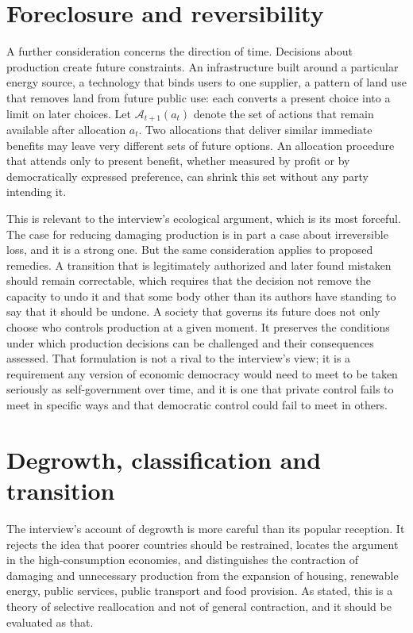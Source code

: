 \documentclass[12pt]{article}
\theoremstyle{definition}
\begin{document}
\section{Foreclosure and reversibility}\label{sec:foreclosure}

A further consideration concerns the direction of time. Decisions about production create future constraints. An infrastructure built around a particular energy source, a technology that binds users to one supplier, a pattern of land use that removes land from future public use: each converts a present choice into a limit on later choices. Let $\mathcal{A}_{t+1}(a_t)$ denote the set of actions that remain available after allocation $a_t$. Two allocations that deliver similar immediate benefits may leave very different sets of future options. An allocation procedure that attends only to present benefit, whether measured by profit or by democratically expressed preference, can shrink this set without any party intending it.

This is relevant to the interview's ecological argument, which is its most forceful. The case for reducing damaging production is in part a case about irreversible loss, and it is a strong one. But the same consideration applies to proposed remedies. A transition that is legitimately authorized and later found mistaken should remain correctable, which requires that the decision not remove the capacity to undo it and that some body other than its authors have standing to say that it should be undone. A society that governs its future does not only choose who controls production at a given moment. It preserves the conditions under which production decisions can be challenged and their consequences assessed. That formulation is not a rival to the interview's view; it is a requirement any version of economic democracy would need to meet to be taken seriously as self-government over time, and it is one that private control fails to meet in specific ways and that democratic control could fail to meet in others.

\section{Degrowth, classification and transition}

The interview's account of degrowth is more careful than its popular reception. It rejects the idea that poorer countries should be restrained, locates the argument in the high-consumption economies, and distinguishes the contraction of damaging and unnecessary production from the expansion of housing, renewable energy, public services, public transport and food provision. As stated, this is a theory of selective reallocation and not of general contraction, and it should be evaluated as that.
\end{document}
